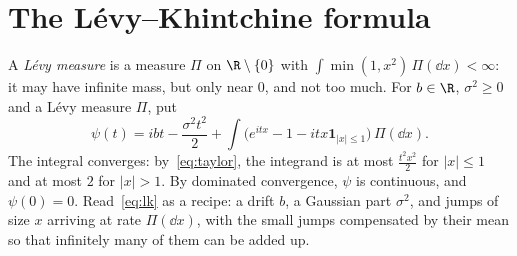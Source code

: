 \section{The L\'evy--Khintchine formula}

A \emph{L\'evy measure} is a measure $\Pi$ on $\R\setminus\{0\}$ with $\int\min(1,x^2)\,\Pi(\dd x)<\infty$: it may have infinite mass, but only near $0$, and
not too much. For $b\in\R$, $\sigma^2\ge0$ and a L\'evy measure $\Pi$, put
\begin{equation}\label{eq:lk}
\psi(t)=ibt-\frac{\sigma^2t^2}2+\int\bigl(e^{itx}-1-itx\mathbf 1_{|x|\le1}\bigr)\,\Pi(\dd x).
\end{equation}
The integral converges: by~\eqref{eq:taylor}, the integrand is at most $\frac{t^2x^2}2$ for $|x|\le1$ and at most $2$ for $|x|>1$. By dominated
convergence, $\psi$ is continuous, and $\psi(0)=0$. Read~\eqref{eq:lk} as a recipe: a drift $b$, a Gaussian part $\sigma^2$, and jumps of size $x$ arriving
at rate $\Pi(\dd x)$, with the small jumps compensated by their mean so that infinitely many of them can be added up.

